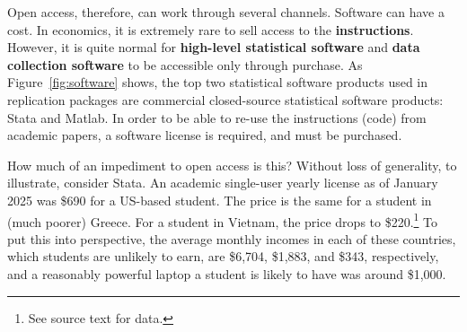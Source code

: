 \documentclass{Revue-economique}
\begin{document}
\begin{Article} [%
	Titre={Reproducibility and Open Science in Economics},
	Auteur={Lars Vilhuber\thanks{Cornell University, lars.vilhuber@cornell.edu}}]
\begin{refsection}[Main]
Open access, therefore, can work through several channels. Software can have a cost. In economics, it is extremely rare to sell access to the \textbf{instructions}. However, it is quite normal for \textbf{high-level statistical software} and \textbf{data collection software} to be accessible only through purchase. As Figure~\ref{fig:software} shows, the top two statistical software products used in replication packages are commercial closed-source statistical software products: Stata and Matlab. In order to be able to re-use the instructions (code) from academic papers, a software license is required, and must be purchased. 

How much of an impediment to open access is this? Without loss of generality, to illustrate, consider Stata. An academic single-user yearly license as of January 2025 was \$690 for a US-based student. The price is the same for a student in (much poorer) Greece. For a student in Vietnam, the price drops to \$220.\footnote{See source text for data.}  To put this into perspective, the average monthly incomes in each of these countries, which students are unlikely to earn, are \$6,704, \$1,883, and \$343, respectively, and a reasonably powerful laptop a student is likely to have was around \$1,000. 





\end{refsection}
\end{Article}
\end{document}
